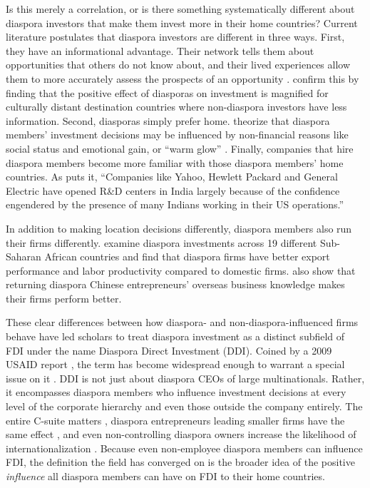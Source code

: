 \documentclass[12pt]{article}
\begin{document}
Is this merely a correlation, or is there something systematically different about diaspora investors that make them invest more in their home countries? Current literature postulates that diaspora investors are different in three ways. First, they have an informational advantage. Their network tells them about opportunities that others do not know about, and their lived experiences allow them to more accurately assess the prospects of an opportunity \citep{leblang_familiarity_2010, useche_highly_2020}. \citet{kugler_migration_2018} confirm this by finding that the positive effect of diasporas on investment is magnified for culturally distant destination countries where non-diaspora investors have less information. Second, diasporas simply prefer home. \citet{nielsen_investing_2009} theorize that diaspora members' investment decisions may be influenced by non-financial reasons like social status and emotional gain, or ``warm glow'' \citep{andreoni_impure_1990}. Finally, companies that hire diaspora members become more familiar with those diaspora members' home countries. As \citet{kapur_diasporas_2001} puts it, ``Companies like Yahoo, Hewlett Packard and General Electric have opened R\&D centers in India largely because of the confidence engendered by the presence of many Indians working in their US operations.''

In addition to making location decisions differently, diaspora members also run their firms differently. \citet{boly_diaspora_2014} examine diaspora investments across 19 different Sub-Saharan African countries and find that diaspora firms have better export performance and labor productivity compared to domestic firms. \citet{liu_under_2019} also show that returning diaspora Chinese entrepreneurs' overseas business knowledge makes their firms perform better.

These clear differences between how diaspora- and non-diaspora-influenced firms behave have led scholars to treat diaspora investment as a distinct subfield of FDI under the name Diaspora Direct Investment (DDI). Coined by a 2009 USAID report \citep{debass_diaspora_2009}, the term has become widespread enough to warrant a special issue on it \citep{alam_iqbal_introduction_2024}. DDI is not just about diaspora CEOs of large multinationals. Rather, it encompasses diaspora members who influence investment decisions at every level of the corporate hierarchy and even those outside the company entirely. The entire C-suite matters \citep{coda_zabetta_foreign-origin_2025}, diaspora entrepreneurs leading smaller firms have the same effect \citep{inouye_counteracting_2020}, and even non-controlling diaspora owners increase the likelihood of internationalization \citep{rabbiosi_diaspora_2019}. Because even non-employee diaspora members can influence FDI, the definition the field has converged on is the broader idea of the positive \textit{influence} all diaspora members can have on FDI to their home countries.
\end{document}
